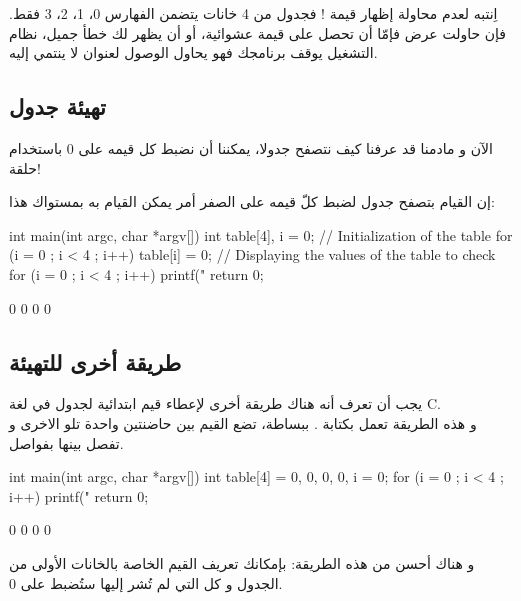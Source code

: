 \begin{critical}
  اِنتبه لعدم محاولة إظهار قيمة
!
فجدول من 4 خانات يتضمن الفهارس 0، 1، 2، 3 فقط. فإن حاولت عرض
فإمّا أن تحصل على قيمة عشوائية، أو أن يظهر لك خطأ جميل، نظام التشغيل يوقف برنامجك فهو يحاول الوصول لعنوان لا ينتمي إليه.
\end{critical}

\subsection{تهيئة جدول}

الآن و مادمنا قد عرفنا كيف نتصفح جدولا، يمكننا أن نضبط كل قيمه على 0 باستخدام حلقة!

إن القيام بتصفح جدول لضبط كلّ قيمه على الصفر أمر يمكن القيام به بمستواك هذا:

\begin{Csource}
int main(int argc, char *argv[])
{
	int table[4], i = 0;
	// Initialization of the table
	for (i = 0 ; i < 4 ; i++)
	{
    		table[i] = 0;
	}
	// Displaying the values of the table to check
	for (i = 0 ; i < 4 ; i++)
	{
    		printf("%
	}
	return 0;
}
\end{Csource}

\begin{Console}
0
0
0
0
\end{Console}

\subsection{طريقة أخرى للتهيئة}

يجب أن تعرف أنه هناك طريقة أخرى لإعطاء قيم ابتدائية لجدول في لغة \textenglish{C}.\\
و هذه الطريقة تعمل بكتابة
.
ببساطة، تضع القيم بين حاضنتين واحدة تلو الاخرى و تفصل بينها بفواصل.

\begin{Csource}
int main(int argc, char *argv[])
{
	int table[4] = {0, 0, 0, 0}, i = 0;
	for (i = 0 ; i < 4 ; i++)
	{
    	printf("%
	}
	return 0;
}
\end{Csource}

\begin{Console}
0
0
0
0
\end{Console}

و هناك أحسن من هذه الطريقة: بإمكانك تعريف القيم الخاصة بالخانات الأولى من الجدول و كل التي لم تُشر إليها ستُضبط على 0.

